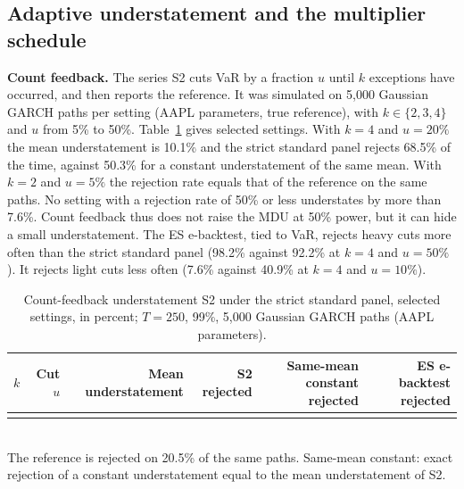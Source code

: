 \documentclass[11pt]{article}
\begin{document}
\subsection{Adaptive understatement and the multiplier schedule}
\label{sec:incentive}

\textbf{Count feedback.} The series S2 cuts VaR by a fraction $u$ until $k$
exceptions have occurred, and then reports the reference. It was simulated on
5,000 Gaussian GARCH paths per setting (AAPL parameters, true reference), with $k \in \{2,3,4\}$ and $u$ from 5\% to 50\%.
Table~\ref{tab:countfb} gives selected settings. With $k = 4$ and $u = 20\%$ the
mean understatement is 10.1\% and the strict standard panel rejects 68.5\% of
the time, against 50.3\% for a constant understatement of the same mean. With
$k = 2$ and $u = 5\%$ the rejection rate equals that of the reference on the
same paths. No setting with a
rejection rate of 50\% or less understates by more than 7.6\%. Count feedback
thus does not raise the MDU at 50\% power, but it can hide a small
understatement. The ES e-backtest, tied to VaR, rejects heavy cuts more often
than the strict standard panel (98.2\% against 92.2\% at $k = 4$ and
$u = 50\%$). It rejects light cuts less often (7.6\% against 40.9\% at
$k = 4$ and $u = 10\%$).

\begin{table}[tbp]
\caption{Count-feedback understatement S2 under the strict standard panel,
selected settings, in percent; $T = 250$, 99\%, 5,000 Gaussian GARCH paths
(AAPL parameters).}
\label{tab:countfb}
\small
\centering
\setlength{\tabcolsep}{4pt}
\begin{tabular}{rrrrrr}
\toprule
$k$ & Cut $u$ & Mean understatement & S2 rejected & Same-mean constant rejected & ES e-backtest rejected \\
\midrule
\\
\bottomrule
\end{tabular}
\\[2pt]
\footnotesize The reference is rejected on 20.5\% of the same paths. Same-mean
constant: exact rejection of a constant understatement equal to the mean
understatement of S2.
\end{table}
\end{document}
